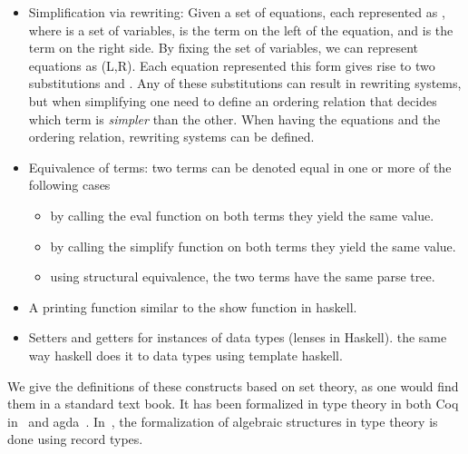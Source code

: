 \begin{itemize}
\begin{itemize}
    \end{itemize}      
    \item Simplification via rewriting: Given a set of equations, each represented as , where  is a set of variables,  is the term on the left of the equation, and  is the term on the right side. By fixing the set of variables, we can represent equations as  (L,R). Each equation represented this form gives rise to two substitutions  and . Any of these substitutions can result in rewriting systems, but when simplifying one need to define an ordering relation that decides which term is \emph{simpler} than the other. When having the equations and the ordering relation, rewriting systems can be defined. 
    \item Equivalence of terms: two terms can be denoted equal in one or more of the following cases 
    \begin{itemize}
        \item by calling the eval function on both terms they yield the same value.  
        \item by calling the simplify function on both terms they yield the same value. 
        \item using structural equivalence, the two terms have the same parse tree. 
    \end{itemize}
    \item A printing function similar to the show function in haskell. 
    \item Setters and getters for instances of data types (lenses in Haskell). the same way haskell does it to data types using template haskell. 
\end{itemize}
We give the definitions of these constructs based on set theory, as one would find them in a standard text book. It has been formalized in type theory in  both Coq in~\cite{capretta99, Spitters2010} and agda~\cite{Gunther2018Agda}. In~\cite{capretta99}, the formalization of algebraic structures in type theory is done using record types. 

